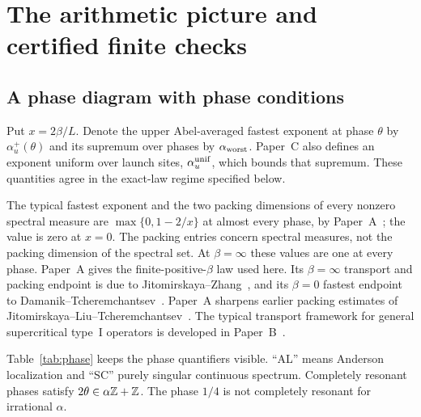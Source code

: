 \section{The arithmetic picture and certified finite checks}\label{sec:diagram}
\subsection{A phase diagram with phase conditions}
Put $x=2\beta/L$. Denote the upper Abel-averaged fastest exponent at phase $\theta$ by $\alpha_u^+(\theta)$ and its supremum over phases by $\alpha_{\rm worst}$. Paper~C also defines an exponent uniform over launch sites, $\alpha_u^{\rm unif}$, which bounds that supremum. These quantities agree in the exact-law regime specified below.

The typical fastest exponent and the two packing dimensions of every nonzero spectral measure are $\max\{0,1-2/x\}$ at almost every phase, by Paper~A~\cite[Theorems~A and C]{PaperA}; the value is zero at $x=0$. The packing entries concern spectral measures, not the packing dimension of the spectral set. At $\beta=\infty$ these values are one at every phase. Paper~A gives the finite-positive-$\beta$ law used here. Its $\beta=\infty$ transport and packing endpoint is due to Jitomirskaya--Zhang~\cite[Corollary~3]{JZ2022}, and its $\beta=0$ fastest endpoint to Damanik--Tcheremchantsev~\cite{DT2007}. Paper~A sharpens earlier packing estimates of Jitomirskaya--Liu--Tcheremchantsev~\cite{JLT2025}. The typical transport framework for general supercritical type~I operators is developed in Paper~B~\cite{PaperB}.

Table~\ref{tab:phase} keeps the phase quantifiers visible. ``AL'' means Anderson localization and ``SC'' purely singular continuous spectrum. Completely resonant phases satisfy $2\theta\in\alpha\mathbb Z+\mathbb Z$. The phase $1/4$ is not completely resonant for irrational $\alpha$.


